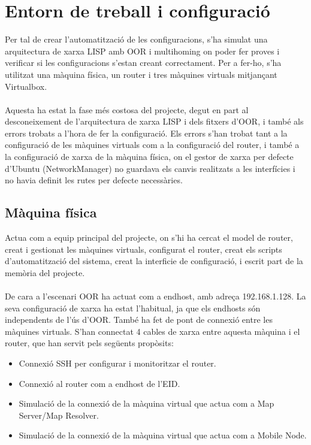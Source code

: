 \documentclass[11pt]{article}
\begin{document}
\section{Entorn de treball i configuració}
Per tal de crear l’automatització de les configuracions, s’ha simulat una arquitectura de xarxa LISP amb OOR i multihoming on poder fer proves i verificar si les configuracions s’estan creant correctament. Per a fer-ho, s’ha utilitzat una màquina física, un router i tres màquines virtuals mitjançant Virtualbox.\\
\\
Aquesta ha estat la fase més costosa del projecte, degut en part al desconeixement de l’arquitectura de xarxa LISP i dels fitxers d’OOR, i també als errors trobats a l’hora de fer la configuració. Els errors s’han trobat tant a la configuració de les màquines virtuals com a la configuració del router, i també a la configuració de xarxa de la màquina física, on el gestor de xarxa per defecte d’Ubuntu (NetworkManager) no guardava els canvis realitzats a les interfícies i no havia definit les rutes per defecte necessàries.

\subsection{Màquina física}
Actua com a equip principal del projecte, on s’hi ha cercat el model de router, creat i gestionat les màquines virtuals, configurat el router, creat els scripts d’automatització del sistema, creat la interficie de configuració, i escrit part de la memòria del projecte.\\
\\
De cara a l’escenari OOR ha actuat com a endhost, amb adreça 192.168.1.128. La seva configuració de xarxa ha estat l’habitual, ja que els endhosts són independents de l’ús d’OOR.
També ha fet de pont de connexió entre les màquines virtuals. S’han connectat 4 cables de xarxa entre aquesta màquina i el router, que han servit pels següents propòsits:
\begin{itemize}
\item Connexió SSH per configurar i monitoritzar el router.
\item Connexió al router com a endhost de l’EID.
\item Simulació de la connexió de la màquina virtual que actua com a Map Server/Map Resolver.
\item Simulació de la connexió de la màquina virtual que actua com a Mobile Node.
\end{itemize}
\end{document}
